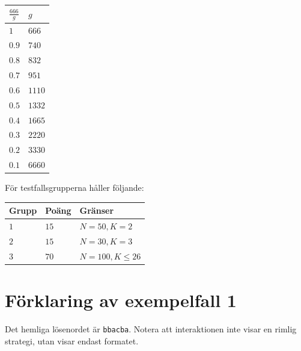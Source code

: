 \begin{center}
  \noindent
  \begin{tabular}{| l | l |}
    \hline
    $\frac{666}{g}$ & $g$ \\ \hline
    $1$             & $666$ \\ \hline
    $0.9$           & $740$ \\ \hline
    $0.8$           & $832$ \\ \hline
    $0.7$           & $951$ \\ \hline
    $0.6$           & $1110$ \\ \hline
    $0.5$           & $1332$ \\ \hline
    $0.4$           & $1665$ \\ \hline
    $0.3$           & $2220$ \\ \hline
    $0.2$           & $3330$ \\ \hline
    $0.1$           & $6660$ \\ \hline
  \end{tabular}
\end{center}
  
För testfallsgrupperna håller följande:


\noindent
\begin{tabular}{| l | l | p{12cm} |}
  \hline
  \textbf{Grupp} & \textbf{Poäng} & \textbf{Gränser} \\ \hline
  $1$    & $15$       & $N = 50, K = 2$ \\ \hline
  $2$    & $15$       & $N = 30, K = 3$ \\ \hline
  $3$    & $70$       & $N = 100, K \leq 26$ \\ \hline
\end{tabular}

\section*{Förklaring av exempelfall 1}
Det hemliga lösenordet är \texttt{bbacba}. Notera att interaktionen inte visar en rimlig strategi,
utan visar endast formatet.
